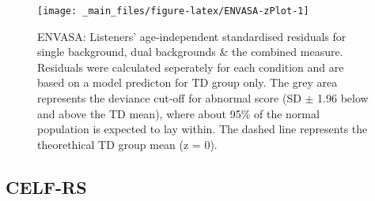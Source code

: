 \documentclass[a4paper, twoside]{templates/ociamthesis}
\begin{document}
\begin{figure}

{\centering \texttt{[image: \_main\_files/figure-latex/ENVASA-zPlot-1]} 

}

\caption{ENVASA: Listeners' age-independent standardised residuals for single background, dual backgrounds \& the combined measure. Residuals were calculated seperately for each condition and are based on a model predicton for TD group only. The grey area represents the deviance cut-off for abnormal score (SD $\pm$ 1.96 below and above the TD mean), where about 95\% of the normal population is expected to lay within. The dashed line represents the theorethical TD group mean (z = 0).}\label{fig:ENVASA-zPlot}
\end{figure}

\begin{table}

\caption{\label{tab:ENVASA-zTab}ENVASA: Descriptive and statistics of the listeners age-independent standard residuals (z-scores) split by groups and test measures.}
\centering
{}
\end{table}

\hypertarget{celf-rs-1}{%
\subsection{CELF-RS}\label{celf-rs-1}}
\end{document}
